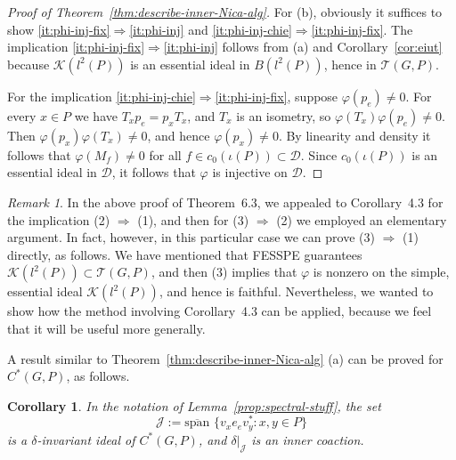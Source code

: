 \documentclass[12pt]{amsart}
\theoremstyle{plain}
\newtheorem{cor}[theorem]{Corollary}
\theoremstyle{remark}
\theoremstyle{definition}
\numberwithin{equation}{section}
\theoremstyle{plain}
\theoremstyle{definition}
\theoremstyle{remark}
\newtheorem{rem}[theorem]{Remark}
\begin{document}
\begin{proof}[Proof of Theorem~\ref{thm:describe-inner-Nica-alg}]
For (b), obviously it suffices to show \eqref{it:phi-inj-fix}$\Rightarrow$\eqref{it:phi-inj} and \eqref{it:phi-inj-chie}$\Rightarrow$\eqref{it:phi-inj-fix}.
The implication \eqref{it:phi-inj-fix}$\Rightarrow$\eqref{it:phi-inj} follows from (a) and Corollary~\ref{cor:eiut} because ${\mathcal K}(l^2(P))$ is an essential ideal in $B(l^2(P))$, hence in
${\mathcal T}(G, P)$.

For the implication \eqref{it:phi-inj-chie}$\Rightarrow$\eqref{it:phi-inj-fix},
suppose $\varphi(p_e)\not=0$.
For every $x\in P$
we have $T_xp_e=p_xT_x$,
and $T_x$ is an isometry,
so
$\varphi(T_x)\varphi(p_e)\not=0$.
Then $\varphi(p_x)\varphi(T_x)\not=0$,
and hence $\varphi(p_x)\not=0$. By linearity and density it follows that $\varphi(M_f)\not=0$ for all $f\in c_0(\iota(P))\subset {\mathcal D}$.
Since $c_0(\iota(P))$ is an essential ideal in ${\mathcal D}$, it follows that $\varphi$ is injective on ${\mathcal D}$.
\end{proof}

\begin{rem}
In the above proof of Theorem~6.3, we appealed to Corollary~4.3 for the
implication (2) $\Rightarrow$ (1), and then for (3) $\Rightarrow$ (2) we
employed an elementary argument. In fact, however, in this particular case we
can prove (3) $\Rightarrow$ (1) directly, as follows. We have
mentioned that FESSPE guarantees ${\mathcal K}(l^2(P))\subset {\mathcal T}(G,P)$,
and then (3) implies that $\varphi$ is nonzero
on the simple, essential ideal ${\mathcal K}(l^2(P))$, and hence is faithful.
Nevertheless, we wanted to show how the method involving Corollary~4.3 can be
applied, because we feel that it will be useful more generally.
\end{rem}

A result similar to Theorem~\ref{thm:describe-inner-Nica-alg} (a) can be proved for $C^*(G, P)$, as follows.

\begin{cor}\label{cor:6.8}
In the notation of Lemma~\ref{prop:spectral-stuff}, the set
\begin{equation}\label{eq:ideal-of-full-algebra}
\mathcal{J}:={\operatorname{\overline{span\!}\,\,}}\{v_xe_ev_y^*: x,y\in P\}
\end{equation}
is a $\delta$-invariant ideal of $C^*(G, P)$, and $\delta\vert_{\mathcal{J}}$ is an inner coaction.
\end{cor}
\end{document}

